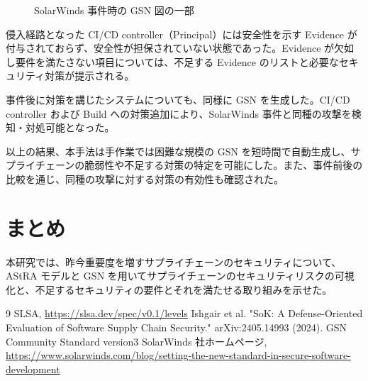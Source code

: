 \documentclass[twocolumn,a4paper,10pt]{ltjsarticle}
\begin{document}
\begin{figure}[htbp]
    \centering
    \caption{SolarWinds 事件時の GSN 図の一部}
    \label{fig:solarwinds}
\end{figure}

侵入経路となった CI/CD controller（Principal）には安全性を示す Evidence が付与されておらず、安全性が担保されていない状態であった。Evidence が欠如し要件を満たさない項目については、不足する Evidence のリストと必要なセキュリティ対策が提示される。


事件後に対策を講じたシステムについても、同様に GSN を生成した。CI/CD controller および Build への対策追加により、SolarWinds 事件と同種の攻撃を検知・対処可能となった。

以上の結果、本手法は手作業では困難な規模の GSN を短時間で自動生成し、サプライチェーンの脆弱性や不足する対策の特定を可能にした。また、事件前後の比較を通じ、同種の攻撃に対する対策の有効性も確認された。

\section{まとめ}
本研究では、昨今重要度を増すサプライチェーンのセキュリティについて、AStRA モデルと GSN を用いてサプライチェーンのセキュリティリスクの可視化と、不足するセキュリティの要件とそれを満たせる取り組みを示せた。

\begin{thebibliography}{9}
 SLSA, \url{https://slsa.dev/spec/v0.1/levels}
 Ishgair et al. "SoK: A Defense-Oriented Evaluation of Software Supply Chain Security." arXiv:2405.14993 (2024).
 GSN Community Standard version3
 SolarWinds 社ホームページ, \url{https://www.solarwinds.com/blog/setting-the-new-standard-in-secure-software-development}
\end{thebibliography}
\end{document}
